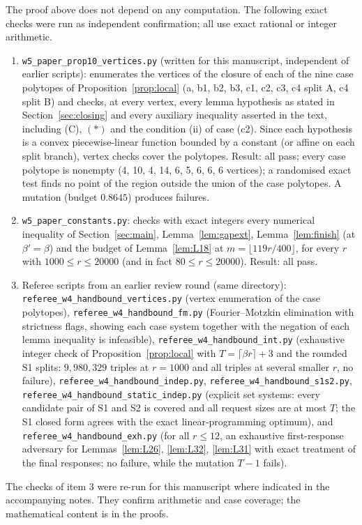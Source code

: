 \documentclass[11pt]{amsart}
\theoremstyle{definition}
\theoremstyle{remark}
\newcommand{\ceil}[1]{\lceil #1\rceil}
\newcommand{\floor}[1]{\lfloor #1\rfloor}
\begin{document}
The proof above does not depend on any computation. The following exact checks were run as independent confirmation; all use exact rational or integer arithmetic.
\begin{enumerate}
\item \texttt{w5\_paper\_prop10\_vertices.py} (written for this manuscript, independent of earlier scripts): enumerates the vertices of the closure of each of the nine case polytopes of Proposition~\ref{prop:local} (a, b1, b2, b3, c1, c2, c3, c4 split A, c4 split B) and checks, at every vertex, every lemma hypothesis as stated in Section~\ref{sec:closing} and every auxiliary inequality asserted in the text, including (C), $(*)$ and the condition (ii) of case (c2). Since each hypothesis is a convex piecewise-linear function bounded by a constant (or affine on each split branch), vertex checks cover the polytopes. Result: all pass; every case polytope is nonempty (4, 10, 4, 14, 6, 5, 6, 6, 6 vertices); a randomised exact test finds no point of the region outside the union of the case polytopes. A mutation (budget $0.8645$) produces failures.
\item \texttt{w5\_paper\_constants.py}: checks with exact integers every numerical inequality of Section~\ref{sec:main}, Lemma~\ref{lem:gapext}, Lemma~\ref{lem:finish} (at $\beta'=\beta$) and the budget of Lemma~\ref{lem:L18} at $m=\floor{119r/400}$, for every $r$ with $1000\le r\le20000$ (and in fact $80\le r\le 20000$). Result: all pass.
\item Referee scripts from an earlier review round (same directory): \texttt{referee\_w4\_handbound\_vertices.py} (vertex enumeration of the case polytopes), \texttt{referee\_w4\_handbound\_fm.py} (Fourier--Motzkin elimination with strictness flags, showing each case system together with the negation of each lemma inequality is infeasible), \texttt{referee\_w4\_handbound\_int.py} (exhaustive integer check of Proposition~\ref{prop:local} with $T=\ceil{\beta r}+3$ and the rounded S1 splits: $9{,}980{,}329$ triples at $r=1000$ and all triples at several smaller $r$, no failure), \texttt{referee\_w4\_handbound\_indep.py}, \texttt{referee\_w4\_handbound\_s1s2.py}, \texttt{referee\_w4\_handbound\_static\_indep.py} (explicit set systems: every candidate pair of S1 and S2 is covered and all request sizes are at most $T$; the S1 closed form agrees with the exact linear-programming optimum), and \texttt{referee\_w4\_handbound\_exh.py} (for all $r\le12$, an exhaustive first-response adversary for Lemmas~\ref{lem:L26}, \ref{lem:L32}, \ref{lem:L31} with exact treatment of the final responses; no failure, while the mutation $T-1$ fails).
\end{enumerate}
The checks of item 3 were re-run for this manuscript where indicated in the accompanying notes. They confirm arithmetic and case coverage; the mathematical content is in the proofs.
\end{document}

